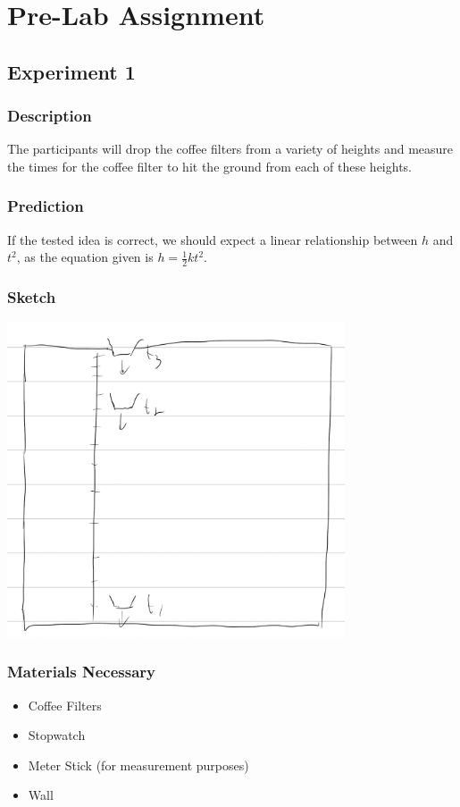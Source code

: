 \documentclass[8pt]{extarticle}
\title{}
\author{Avinash Iyer}
\date{}
\begin{document}
{
\section*{Pre-Lab Assignment}
\subsection*{Experiment 1}
\subsubsection*{Description}
The participants will drop the coffee filters from a variety of heights and measure the times for the coffee filter to hit the ground from each of these heights.
\subsubsection*{Prediction}
If the tested idea is correct, we should expect a linear relationship between $h$ and $t^2$, as the equation given is $h = \frac{1}{2} kt^2$.
\subsubsection*{Sketch}
\begin{center}
	\includegraphics[width=10cm]{Lab6Image1_1}
\end{center}
\subsubsection*{Materials Necessary}
\begin{itemize}
	\item Coffee Filters
	\item Stopwatch
	\item Meter Stick (for measurement purposes)
	\item Wall
\end{itemize}
}
\end{document}
